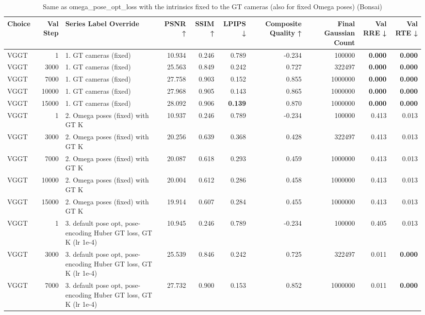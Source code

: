 \begin{table}[H]
\caption{\ifdefined\customcaption \customcaption \else Same as omega_pose_opt_loss with the intrinsics fixed to the GT cameras (also for fixed Omega poses) (Bonsai) \fi}
\label{tab:106_omega_pose_opt_gtk_bonsai}
\centering
\tiny
\begin{tabular}{lrlrrrrrrr}
\toprule
Choice & Val Step & Series Label Override & PSNR ↑ & SSIM ↑ & LPIPS ↓ & Composite Quality ↑ & Final Gaussian Count & Val RRE ↓ & Val RTE ↓ \\
\midrule
VGGT & 1 & 1. GT cameras (fixed) & 10.934 & 0.246 & 0.789 & -0.234 & 100000 & \textbf{0.000} & \textbf{0.000} \\
VGGT & 3000 & 1. GT cameras (fixed) & 25.563 & 0.849 & 0.242 & 0.727 & 322497 & \textbf{0.000} & \textbf{0.000} \\
VGGT & 7000 & 1. GT cameras (fixed) & 27.758 & 0.903 & 0.152 & 0.855 & 1000000 & \textbf{0.000} & \textbf{0.000} \\
VGGT & 10000 & 1. GT cameras (fixed) & 27.968 & 0.905 & 0.143 & 0.865 & 1000000 & \textbf{0.000} & \textbf{0.000} \\
VGGT & 15000 & 1. GT cameras (fixed) & 28.092 & 0.906 & \textbf{0.139} & 0.870 & 1000000 & \textbf{0.000} & \textbf{0.000} \\
VGGT & 1 & 2. Omega poses (fixed) with GT K & 10.937 & 0.246 & 0.789 & -0.234 & 100000 & 0.413 & 0.013 \\
VGGT & 3000 & 2. Omega poses (fixed) with GT K & 20.256 & 0.639 & 0.368 & 0.428 & 322497 & 0.413 & 0.013 \\
VGGT & 7000 & 2. Omega poses (fixed) with GT K & 20.087 & 0.618 & 0.293 & 0.459 & 1000000 & 0.413 & 0.013 \\
VGGT & 10000 & 2. Omega poses (fixed) with GT K & 20.004 & 0.612 & 0.286 & 0.458 & 1000000 & 0.413 & 0.013 \\
VGGT & 15000 & 2. Omega poses (fixed) with GT K & 19.914 & 0.607 & 0.284 & 0.455 & 1000000 & 0.413 & 0.013 \\
VGGT & 1 & 3. default pose opt, pose-encoding Huber GT loss, GT K (lr 1e-4) & 10.945 & 0.246 & 0.789 & -0.234 & 100000 & 0.405 & 0.013 \\
VGGT & 3000 & 3. default pose opt, pose-encoding Huber GT loss, GT K (lr 1e-4) & 25.539 & 0.846 & 0.242 & 0.725 & 322497 & 0.011 & \textbf{0.000} \\
VGGT & 7000 & 3. default pose opt, pose-encoding Huber GT loss, GT K (lr 1e-4) & 27.732 & 0.900 & 0.153 & 0.852 & 1000000 & 0.011 & \textbf{0.000} \\

\end{tabular}
\end{table}

